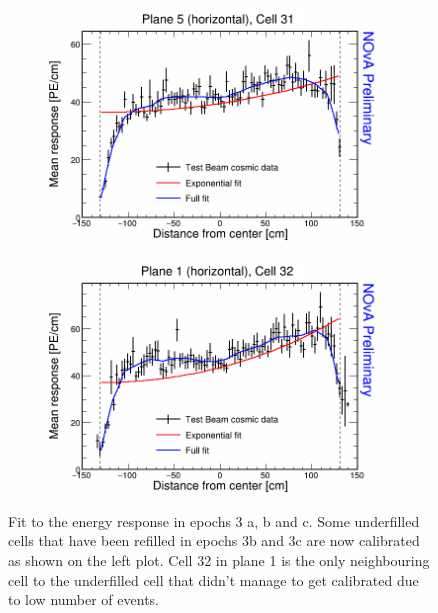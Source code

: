 \begin{figure}[h]
  \begin{subfigure}{0.5\textwidth}
    \includegraphics[width=\linewidth]{RelativeCalibrationResults/ep3abc_005_031.png}
  \end{subfigure}
  \begin{subfigure}{0.5\textwidth}
    \includegraphics[width=\linewidth]{RelativeCalibrationResults/ep3abc_001_032.png}
  \end{subfigure}
  \caption{Fit to the energy response in epochs 3 a, b and c. Some underfilled cells that have been refilled in epochs 3b and 3c are now calibrated as shown on the left plot. Cell 32 in plane 1 is the only neighbouring cell to the underfilled cell that didn't manage to get calibrated due to low number of events.}
  \label{fig:AttenfitResultsEpoch3abc_UnderfilledCellsNeighbours}
\end{figure}

